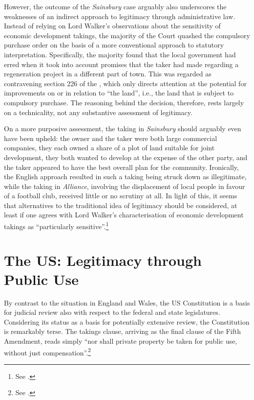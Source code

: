 However, the outcome of the {\it Sainsbury} case arguably also underscores the weaknesses of an indirect approach to legitimacy through administrative law. Instead of relying on Lord Walker's observations about the sensitivity of economic development takings, the majority of the Court quashed the compulsory purchase order on the basis of a more conventional approach to statutory interpretation. Specifically, the majority found that the local government had erred when it took into account promises that the taker had made regarding a regeneration project in a different part of town. This was regarded as contravening section 226 of the \cite{tcpa90}, which only directs attention at the potential for improvements on or in relation to ``the land'', i.e., the land that is subject to compulsory purchase. The reasoning behind the decision, therefore, rests largely on a technicality, not any substantive assessment of legitimacy.

On a more purposive assessment, the taking in {\it Sainsbury} should arguably even have been upheld: the owner and the taker were both large commercial companies, they each owned a share of a plot of land suitable for joint development, they both wanted to develop at the expense of the other party, and the taker appeared to have the best overall plan for the community. Ironically, the English approach resulted in such a taking being struck down as illegitimate, while the taking in {\it Alliance}, involving the displacement of local people in favour of a football club, received little or no scrutiny at all. In light of this, it seems that alternatives to the traditional idea of legitimacy should be considered, at least if one agrees with Lord Walker's characterisation of economic development takings as ``particularly sensitive''.\footnote{See \cite[82]{sainsbury10}.}


\section{The US: Legitimacy through Public Use}\label{sec:3:3}

By contrast to the situation in England and Wales, the US Constitution is a basis for judicial review also with respect to the federal and state legislatures. Considering its status as a basis for potentially extensive review, the Constitution is remarkably terse. The takings clause, arriving as the final clause of the Fifth Amendment, reads simply ``nor shall private property be taken for public use, without just compensation''.\footnote{See \cite{fifth}.}

